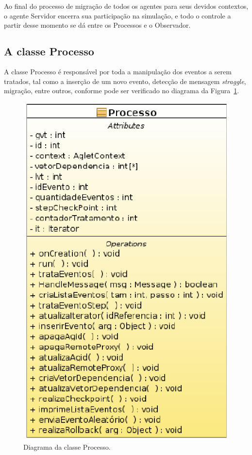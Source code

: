 Ao final do processo de migração de todos os agentes para seus devidos contextos, o agente Servidor encerra sua participação na simulação, e todo o controle a partir desse momento se dá entre os Processos e o Observador.


\subsection{A classe Processo}

A classe Processo é responsável por toda a manipulação dos eventos a serem tratados, tal como a inserção de um novo evento, detecção de mensagem \textit{straggle}, migração, entre outros, conforme pode ser verificado no diagrama da Figura~\ref{fig:diagrama_processo}.

\begin{figure}[htb]
  \centering
  \centerline{\includegraphics[scale=0.6]{imagens/diagrama_processo.eps}}
  \caption{ Diagrama da classe Processo.}
\label{fig:diagrama_processo}
\end{figure}


